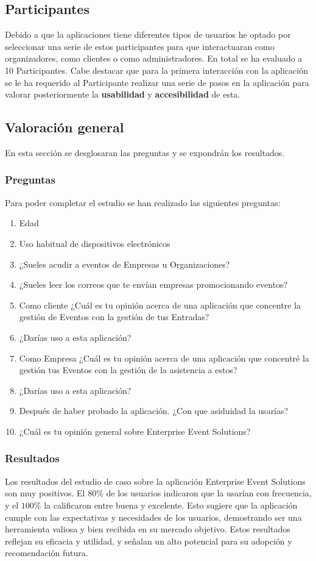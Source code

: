 \subsection{Participantes}
Debido a que la aplicaciones tiene diferentes tipos de usuarios he optado por seleccionar una serie de estos participantes para que interactuaran como organizadores,
como clientes o como administradores. En total se ha evaluado a 10 Participantes.
Cabe destacar que para la primera interacción con la aplicación se le ha requerido al Participante realizar una serie de pasos en la aplicación para 
valorar posteriormente la \textbf{usabilidad} y \textbf{accesibilidad} de esta.

\subsection{Valoración general}
En esta sección se desglosaran las preguntas y se expondrán los resultados.
\subsubsection*{Preguntas}
Para poder completar el estudio se han realizado las siguientes preguntas:
\begin{enumerate}
    \item Edad
    \item Uso habitual de dispositivos electrónicos
    \item ¿Sueles acudir a eventos de Empresas u Organizaciones?
    \item ¿Sueles leer los correos que te envían empresas promocionando eventos? 
    \item Como cliente ¿Cuál es tu opinión acerca de una aplicación que concentre la gestión de Eventos con la gestión de tus Entradas?
    \item ¿Darías uso a esta aplicación?
    \item Como Empresa ¿Cuál es tu opinión acerca de una aplicación que concentré la gestión tus Eventos con la gestión de la asistencia a estos?
    \item ¿Darías uso a esta aplicación?
    \item Después de haber probado la aplicación. ¿Con que asiduidad la usarías?
    \item ¿Cuál es tu opinión general sobre Enterprise Event Solutions?
\end{enumerate}
\subsubsection*{Resultados}
Los resultados del estudio de caso sobre la aplicación Enterprise Event Solutions son muy positivos. El \(80\%\) de los usuarios indicaron que la usarían con frecuencia, y el
\(100\%\) la calificaron entre buena y excelente. Esto sugiere que la aplicación cumple con las expectativas y necesidades de los usuarios, demostrando ser una herramienta valiosa
y bien recibida en su mercado objetivo. Estos resultados reflejan su eficacia y utilidad, y señalan un alto potencial para su adopción y recomendación futura.


